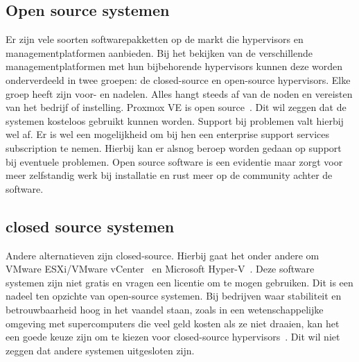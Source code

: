\subsection{Open source systemen}
Er zijn vele soorten softwarepakketten op de markt die hypervisors en managementplatformen aanbieden. Bij het bekijken van de verschillende managementplatformen met hun bijbehorende hypervisors kunnen deze worden onderverdeeld in twee groepen: de closed-source en open-source hypervisors. Elke groep heeft zijn voor- en nadelen. Alles hangt steeds af van de noden en vereisten van het bedrijf of instelling.
Proxmox VE is open source~\autocite{Proxmox}. Dit wil zeggen dat de systemen kosteloos gebruikt kunnen worden. Support bij problemen valt hierbij wel af. Er is wel een mogelijkheid om bij hen een enterprise support services subscription te nemen. Hierbij kan er alsnog beroep worden gedaan op support bij eventuele problemen.
Open source software is een evidentie maar zorgt voor meer zelfstandig werk bij installatie en rust meer op de community achter de software.

\subsection{closed source systemen}
Andere alternatieven zijn closed-source. Hierbij gaat het onder andere om VMware ESXi/VMware vCenter~\autocite{vmware} en Microsoft Hyper-V~\autocite{Eaton2019}. Deze software systemen zijn niet gratis en vragen een licentie om te mogen gebruiken. Dit is een nadeel ten opzichte van open-source systemen.
Bij bedrijven waar stabiliteit en betrouwbaarheid hoog in het vaandel staan, zoals in een wetenschappelijke omgeving met supercomputers die veel geld kosten als ze niet draaien, kan het een goede keuze zijn om te kiezen voor closed-source hypervisors~\autocite{voras2012early}. Dit wil niet zeggen dat andere systemen uitgesloten zijn.


